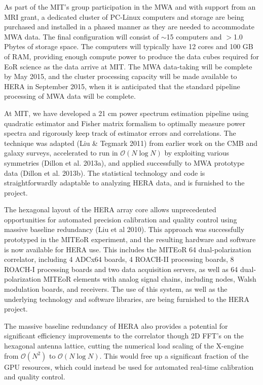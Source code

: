 \documentclass[11pt]{article}
\begin{document}
As part of the MIT's group participation in the MWA and with support from an
MRI grant, a dedicated cluster of PC-Linux computers and storage are being
purchased and installed in a phased manner as they are needed to accommodate
MWA data. The final configuration will consist of $\sim$15 computers and $>$1.0 Pbytes
of storage space. The computers will typically have 12 cores and 100 GB of RAM,
providing enough compute power to produce the data cubes required for EoR
science as the data arrive at MIT. The MWA data-taking will be complete by May
2015, and the cluster processing capacity will be made available to HERA in
September 2015, when it is anticipated that the standard pipeline processing of MWA 
data will be complete.

At MIT, we have developed a 21 cm power spectrum estimation pipeline using
quadratic estimator and Fisher matrix formalism to optimally measure power
spectra and rigorously keep track of estimator errors and correlations.  The
technique was adapted (Liu \& Tegmark 2011) from earlier work on the CMB and
galaxy surveys, accelerated to run in $\mathcal{O}(N\log N)$ by exploiting
various symmetries (Dillon et al. 2013a), and applied successfully to MWA
prototype data (Dillon et al. 2013b). The statistical technology and code is
straightforwardly adaptable to analyzing HERA data, and is furnished to the project.

The hexagonal layout of the HERA array core allows unprecedented opportunities
for automated precision calibration and quality control using massive baseline
redundancy (Liu et al 2010). This approach was successfully prototyped in the
MITEoR experiment, and the resulting hardware and software is now available for
HERA use. This includes the MITEoR 64 dual-polarization correlator, including 4
ADCx64 boards, 4 ROACH-II processing boards, 8 ROACH-I processing boards and
two data acquisition servers, as well as 64 dual-polarization MITEoR elements
with analog signal chains, including nodes, Walsh modulation boards, and
receivers.  The use of this system, as well as the underlying technology
and software libraries, are being furnished to the HERA project.

The massive baseline redundancy of HERA also provides a potential for
significant efficiency improvements to the correlator though 2D FFT's on the
hexagonal antenna lattice, cutting the numerical load scaling of the X-engine
from $\mathcal{O}(N^2)$ to $\mathcal{O}(N \log N)$. This would free up a significant fraction of the GPU
resources, which could instead be used for automated real-time calibration and
quality control.
\end{document}
